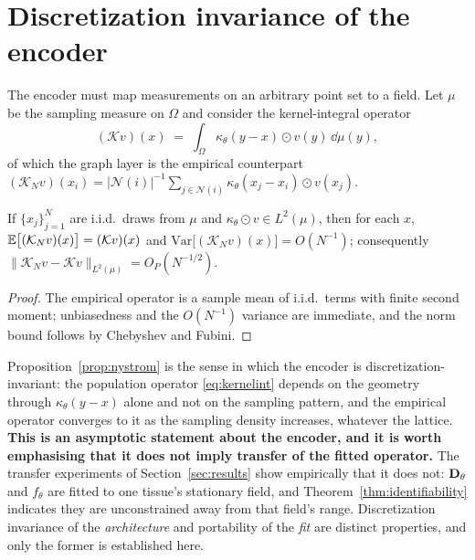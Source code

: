 \section{Discretization invariance of the encoder}
\label{app:discretization}

The encoder must map measurements on an arbitrary point set to a field. Let
$\mu$ be the sampling measure on $\Omega$ and consider the kernel-integral
operator
\begin{equation}
(\mathcal{K}v)(x) \;=\; \int_\Omega \kappa_\theta(y-x)\odot v(y)\,\dd\mu(y),
\label{eq:kernelint}
\end{equation}
of which the graph layer is the empirical counterpart
$(\mathcal{K}_N v)(x_i) = |\mathcal{N}(i)|^{-1}\sum_{j\in\mathcal{N}(i)}
\kappa_\theta(x_j-x_i)\odot v(x_j)$.

\begin{proposition}
\label{prop:nystrom}
If $\{x_j\}_{j=1}^N$ are i.i.d.\ draws from $\mu$ and
$\kappa_\theta\odot v \in L^2(\mu)$, then for each $x$,
$\mathbb{E}\big[(\mathcal{K}_Nv)(x)\big] = (\mathcal{K}v)(x)$ and
$\mathrm{Var}\big[(\mathcal{K}_Nv)(x)\big] = O(N^{-1})$; consequently
$\|\mathcal{K}_N v - \mathcal{K}v\|_{L^2(\mu)} = O_P(N^{-1/2})$.
\end{proposition}

\begin{proof}
The empirical operator is a sample mean of i.i.d.\ terms with finite second
moment; unbiasedness and the $O(N^{-1})$ variance are immediate, and the norm
bound follows by Chebyshev and Fubini.
\end{proof}

Proposition~\ref{prop:nystrom} is the sense in which the encoder is
discretization-invariant: the population operator \eqref{eq:kernelint} depends on
the geometry through $\kappa_\theta(y-x)$ alone and not on the sampling pattern,
and the empirical operator converges to it as the sampling density increases,
whatever the lattice. \textbf{This is an asymptotic statement about the encoder,
and it is worth emphasising that it does not imply transfer of the fitted
operator.} The transfer experiments of
Section~\ref{sec:results} show empirically that it does not: $\mathbf{D}_\theta$ and
$f_\theta$ are fitted to one tissue's stationary field, and
Theorem~\ref{thm:identifiability} indicates they are unconstrained away from that
field's range. Discretization invariance of the \emph{architecture} and
portability of the \emph{fit} are distinct properties, and only the former is
established here.

